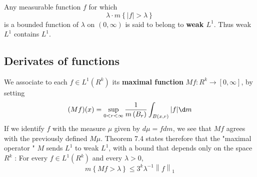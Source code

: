 \documentclass[12pt, a4paper, oneside]{book}
\begin{document}
\begin{definition}
    Any measurable function $f$ for which
    $$
        \lambda \cdot m\left\{|f|>\lambda\right\}
    $$
    is a bounded function of $\lambda$ on $(0, \infty)$ is said to belong to\textbf{ weak $L^1$}.
    Thus weak $L^1$ contains $L^1$.
\end{definition}

\subsection{Derivates of functions}
\begin{definition}
    We associate to each $f \in L^1\left(R^k\right)$ its \textbf{maximal function} $M f: R^k \rightarrow[0, \infty]$, by setting
    \begin{equation*}
        (M f)(x)
        =
        \sup _{0<r<\infty} \frac{1}{m\left(B_r\right)} \int_{B(x, r)}|f| \d  m
    \end{equation*}
    If we identify $f$ with the measure $\mu$ given by $d \mu=f d m$, we see that $M f$ agrees with the previously defined $M \mu$. Theorem 7.4 states therefore that the "maximal operator " $M$ sends $L^1$ to weak $L^1$, with a bound that depends only on the space $R^k$ :
    For every $f \in L^1\left(R^k\right)$ and every $\lambda>0$,
    \begin{equation*}
        m\left\{M f>\lambda\right\}
        \leq
        3^k \lambda^{-1}\left\| f \right\|_1
    \end{equation*}

\end{definition}
\end{document}
